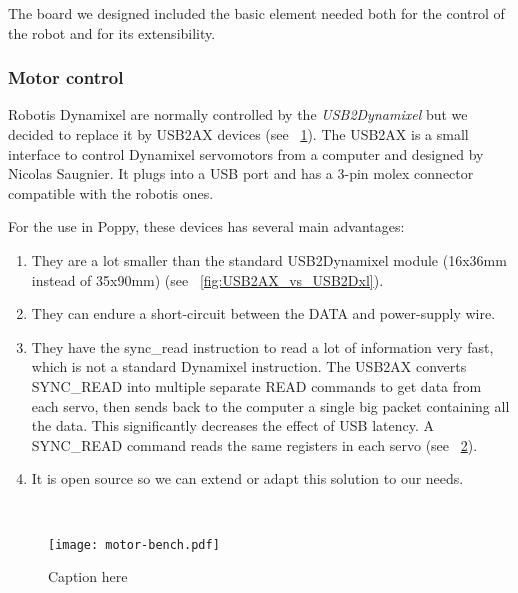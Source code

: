 The board we designed included the basic element needed both for the control of the robot and for its extensibility.


\subsubsection{Motor control} %
Robotis Dynamixel are normally controlled by the \emph{USB2Dynamixel} but we decided to replace it by USB2AX devices (see \figurename~\ref{fig:usb2ax}). The USB2AX is a small interface to control Dynamixel servomotors from a computer and designed by Nicolas Saugnier. It plugs into a USB port and has a 3-pin molex connector compatible with the robotis ones.

For the use in Poppy, these devices has several main advantages:
\begin{enumerate}
    \item They are a lot smaller than the standard USB2Dynamixel module (16x36mm instead of 35x90mm) (see \figurename~\ref{fig:USB2AX_vs_USB2Dxl}).
    \item They can endure a short-circuit between the DATA and power-supply wire.
    \item They have the sync\_read instruction to read a lot of information very fast, which is not a standard Dynamixel instruction. The USB2AX converts SYNC\_READ into multiple separate READ commands to get data from each servo, then sends back to the computer a single big packet containing all the data. This significantly decreases the effect of USB latency. A SYNC\_READ command reads the same registers in each servo (see \figurename~\ref{fig:usb2ax-perf}).
    \item It is open source so we can extend or adapt this solution to our needs.
\end{enumerate}

\begin{figure}[tb]
\centering
    \hfil
    \\
    \caption{}
    \label{fig:usb2ax}
\end{figure}

\begin{figure}[tb]
    \begin{center}
        \texttt{[image: motor-bench.pdf]}
    \end{center}
    \caption{Caption here}
    \label{fig:usb2ax-perf}
\end{figure}

